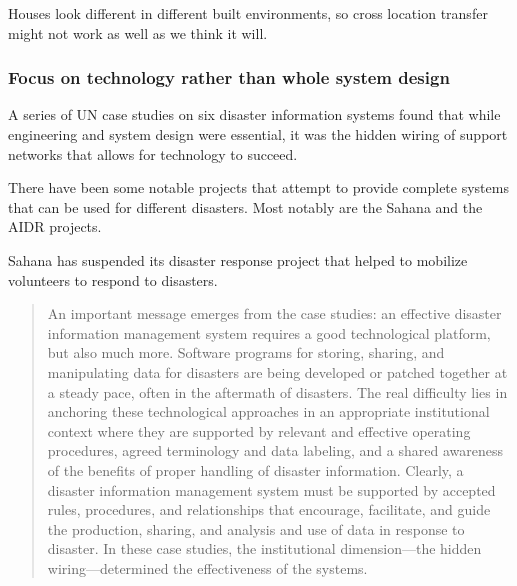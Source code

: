 Houses look different in different built environments, so cross location
transfer might not work as well as we think it will.


\subsubsection{Focus on technology rather than whole system design}
A series of UN case studies on six disaster information systems found that while
engineering and system design were essential, it was the hidden wiring of support
networks that allows for technology to succeed.

There have been some notable projects that attempt to provide complete systems
that can be used for different disasters. Most notably are the Sahana and the
AIDR projects.

Sahana has suspended its disaster response project that helped to
mobilize volunteers to respond to disasters.
  
\begin{quote}
An important message emerges from the case studies: an effective disaster
information management system requires a good technological platform,
but also much more. Software programs for storing, sharing, and manipulating
data for disasters are being developed or patched together at a steady pace,
often in the aftermath of disasters. The real difficulty lies in anchoring
these technological approaches in an appropriate institutional context where
they are supported by relevant and effective operating procedures, agreed
terminology and data labeling, and a shared awareness of the benefits of proper
handling of disaster information. Clearly, a disaster information management
system must be supported by accepted rules, procedures, and relationships
that encourage, facilitate, and guide the production, sharing, and analysis and
use of data in response to disaster. In these case studies, the institutional
dimension---the hidden wiring---determined the effectiveness of the
systems.~\cite{aminDataNaturalDisasters2008}
\end{quote}

